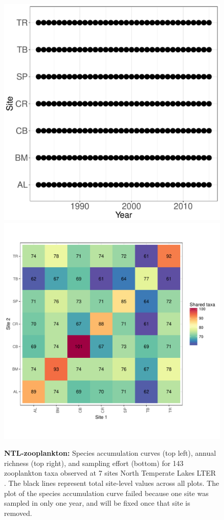 \documentclass[11pt, oneside]{article}
\begin{document}
\begin{figure}[h!]
\includegraphics[scale = 0.4]{ntl-zooplankton-stanleyLottig_spatiotemporal_sampling_effort.pdf}
\includegraphics[scale = 0.4]{ntl-zooplankton-stanleyLottig_spp_shared.pdf}
\caption{{\bf NTL-zooplankton:} Species accumulation curves (top left),  annual richness (top right), and sampling effort (bottom)  for 143 zooplankton taxa observed at 7 sites North Temperate Lakes LTER . The black lines represent total site-level values across all plots. The plot of the species accumulation curve failed because one site was sampled in only one year, and will be fixed once that site is removed.}
\label{ntl-zooplankton}
\end{figure}
\end{document}
